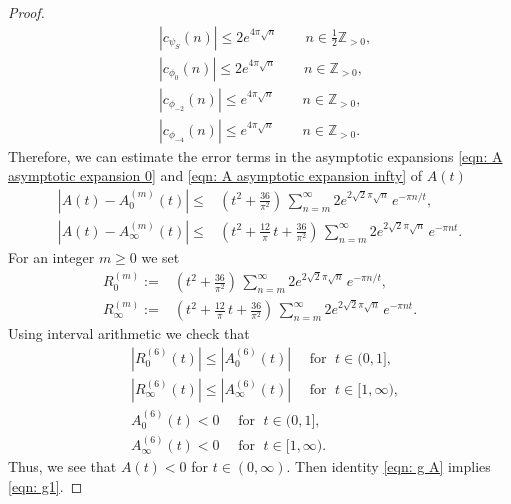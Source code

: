 \documentclass{scrartcl}
\newcommand{\Z}{\mathbb{Z}}
\begin{document}
\begin{proof}
\begin{align}\label{eqn: Fourier estimate 2}
&|c_{\psi_S}(n)|\leq 2e^{4\pi\sqrt{n}}\qquad n\in\tfrac 12 \Z_{>0} ,\\
&|c_{\phi_0}(n)|\leq 2e^{4\pi\sqrt{n}}\qquad n\in \Z_{>0} ,\\
&|c_{\phi_{-2}}(n)|\leq e^{4\pi\sqrt{n}}\qquad n\in  \Z_{>0},\\
&|c_{\phi_{-4}}(n)|\leq e^{4\pi\sqrt{n}}\qquad n\in \Z_{>0}. \label{eqn: Fourier estimate 5}
 \end{align}
Therefore, we can estimate the error terms in the asymptotic expansions \eqref{eqn: A asymptotic expansion 0} and \eqref{eqn: A asymptotic expansion infty} of $A(t)$
\begin{align*}
\left|A(t)-A_0^{(m)}(t)\right|\leq& (t^2+\frac{36}{\pi^2})\,\sum_{n=m}^\infty 2e^{2\sqrt{2}\pi\sqrt{n}}\,e^{-\pi n/t},\\
\left|A(t)-A_\infty^{(m)}(t)\right|\leq& (t^2+\frac{12}{\pi}\,t+\frac{36}{\pi^2})\,\sum_{n=m}^\infty 2e^{2\sqrt{2}\pi\sqrt{n}}\,e^{-\pi nt}.
\end{align*}
 For an integer $m\geq0$ we set
\begin{align*}
R^{(m)}_0:=&(t^2+\frac{36}{\pi^2})\,\sum_{n=m}^\infty 2e^{2\sqrt{2}\pi\sqrt{n}}\,e^{-\pi n/t},\\
R^{(m)}_\infty:=&(t^2+\frac{12}{\pi}\,t+\frac{36}{\pi^2})\,\sum_{n=m}^\infty 2e^{2\sqrt{2}\pi\sqrt{n}}\,e^{-\pi nt}.
\end{align*}
Using interval arithmetic we check that
\begin{align*}
&\left|R_0^{(6)}(t)\right|\leq\left|A_0^{(6)}(t)\right|\quad\mbox{ for }\;t\in(0,1],\\
&\left|R_\infty^{(6)}(t)\right|\leq\left|A_\infty^{(6)}(t)\right|\quad\mbox{ for }\;t\in[1,\infty),\\
&A_0^{(6)}(t)<0\quad\mbox{ for }\;t\in(0,1],\\
&A_\infty^{(6)}(t)<0\quad\mbox{ for }\;t\in[1,\infty).
\end{align*}
Thus, we see that $A(t)<0$ for $t\in (0,\infty)$. Then identity \eqref{eqn: g A} implies \eqref{eqn: g1}.



\end{proof}
\end{document}
